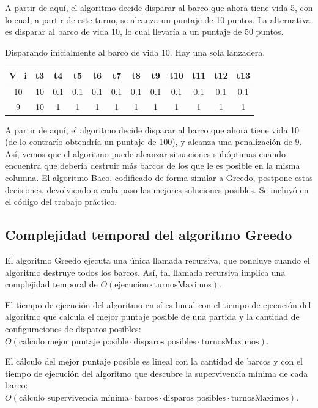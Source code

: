 \documentclass{article}
\begin{document}
A partir de aquí, el algoritmo decide disparar al barco que ahora tiene vida 5, con lo cual, a partir de este turno, se alcanza un puntaje de 10 puntos. La alternativa es disparar al barco de vida 10, lo cual llevaría a un puntaje de 50 puntos.

Disparando inicialmente al barco de vida 10. Hay una sola lanzadera. \\
\begin{center}
\begin{tabular}{ c | c c c c c c c c c c c}
\hline
V\_i &   t3 & t4 & t5 & t6 & t7 & t8 & t9 & t10 & t11 & t12 & t13 \\
\hline
10    &  10 &  0.1 &  0.1 &  0.1 & 0.1 &  0.1 &  0.1 &  0.1 &  0.1 & 0.1  & 0.1 \\
9     &  10 &  1 &  1 &  1 & 1 &  1 &  1 &  1 &  1 & 1  & 1
\end{tabular}
\end{center}

A partir de aquí, el algoritmo decide disparar al barco que ahora tiene vida 10 (de lo contrarío obtendría un puntaje de 100), y alcanza una penalización de 9.\\

Así, vemos que el algoritmo puede alcanzar situaciones subóptimas cuando encuentra que debería destruir más barcos de los que le es posible en la misma columna. El algoritmo Baco, codificado de forma similar a Greedo, postpone estas decisiones, devolviendo a cada paso las mejores soluciones posibles. Se incluyó en el código del trabajo práctico.

\subsection{Complejidad temporal del algoritmo Greedo}
El algoritmo Greedo ejecuta una única llamada recursiva, que concluye cuando el algoritmo destruye todos los barcos. Así, tal llamada recursiva implica una complejidad temporal de $O(\text{ejecucion} \cdot \text{turnosMaximos})$.

El tiempo de ejecución del algoritmo en sí es lineal con el tiempo de ejecución del algoritmo que calcula el mejor puntaje posible de una partida y la cantidad de configuraciones de disparos posibles: $O(\text{calculo mejor puntaje posible} \cdot \text{disparos posibles} \cdot \text{turnosMaximos})$.

El cálculo del mejor puntaje posible es lineal con la cantidad de barcos y con el tiempo de ejecución del algoritmo que descubre la supervivencia mínima de cada barco:$O(\text{cálculo supervivencia mínima} \cdot \text{barcos}  \cdot \text{disparos posibles} \cdot \text{turnosMaximos})$.
\end{document}
